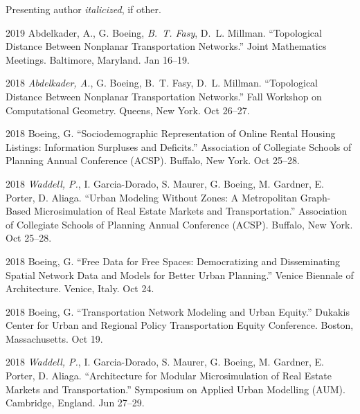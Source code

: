 \documentclass[12pt,letterpaper]{report}
\begin{document}
	Presenting author \textit{italicized}, if other.\bigskip
	
	\begin{tablist}
		
		\item[2019] \tab Abdelkader, A., G. Boeing, \textit{B.~T. Fasy}, D.~L. Millman. \enquote{Topological Distance Between Nonplanar Transportation Networks.} Joint Mathematics Meetings. Baltimore, Maryland. Jan 16--19.	
		
		\item[2018] \tab \textit{Abdelkader, A.}, G. Boeing, B.~T. Fasy, D.~L. Millman. \enquote{Topological Distance Between Nonplanar Transportation Networks.} Fall Workshop on Computational Geometry. Queens, New York. Oct 26--27.
		
		\item[2018] \tab Boeing, G. \enquote{Sociodemographic Representation of Online Rental Housing Listings: Information Surpluses and Deficits.} Association of Collegiate Schools of Planning Annual Conference (ACSP). Buffalo, New York. Oct 25--28.
		
		\item[2018] \tab \textit{Waddell, P.}, I. Garcia-Dorado, S. Maurer, G. Boeing, M. Gardner, E. Porter, D. Aliaga. \enquote{Urban Modeling Without Zones: A Metropolitan Graph-Based Microsimulation of Real Estate Markets and Transportation.} Association of Collegiate Schools of Planning Annual Conference (ACSP). Buffalo, New York. Oct 25--28.
		
		\item[2018] \tab Boeing, G. \enquote{Free Data for Free Spaces: Democratizing and Disseminating Spatial Network Data and Models for Better Urban Planning.} Venice Biennale of Architecture. Venice, Italy. Oct 24.
		
		\item[2018] \tab Boeing, G. \enquote{Transportation Network Modeling and Urban Equity.} Dukakis Center for Urban and Regional Policy Transportation Equity Conference. Boston, Massachusetts. Oct 19.
		
		\item[2018] \tab \textit{Waddell, P.}, I. Garcia-Dorado, S. Maurer, G. Boeing, M. Gardner, E. Porter, D. Aliaga. \enquote{Architecture for Modular Microsimulation of Real Estate Markets and Transportation.} Symposium on Applied Urban Modelling (AUM). Cambridge, England. Jun 27--29.
		

\end{tablist}
\end{document}
